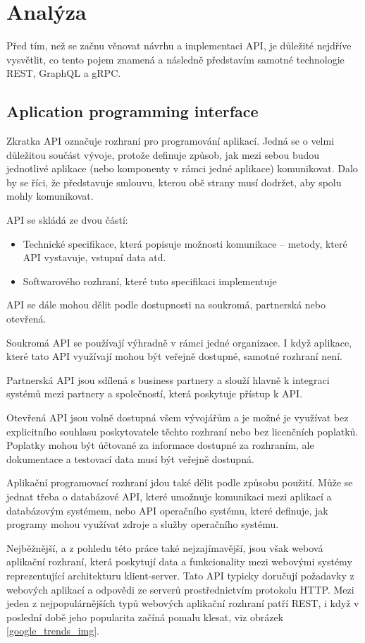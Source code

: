 \documentclass[thesis=M,czech]{FITthesis}[2019/12/23]
\begin{document}
\chapter{Analýza}
Před tím, než se začnu věnovat návrhu a implementaci API, je důležité nejdříve vysvětlit, co tento pojem znamená a následně představím samotné technologie REST, GraphQL a gRPC.

\section{Aplication programming interface}
Zkratka API označuje rozhraní pro programování aplikací. Jedná se o velmi důležitou součást vývoje, protože definuje způsob, jak mezi sebou budou jednotlivé aplikace (nebo komponenty v rámci jedné aplikace) komunikovat. Dalo by se říci, že představuje smlouvu, kterou obě strany musí dodržet, aby spolu mohly komunikovat.

API se skládá ze dvou částí: 
\begin{itemize}
    \item Technické specifikace, která popisuje možnosti komunikace -- metody, které API vystavuje, vstupní data atd.
    \item Softwarového rozhraní, které tuto specifikaci implementuje
\end{itemize}

API se dále mohou dělit podle dostupnosti na soukromá, partnerská nebo otevřená. 

Soukromá API se používají výhradně v rámci jedné organizace. I když aplikace, které tato API využívají mohou být veřejně dostupné, samotné rozhraní není.

Partnerská API jsou sdílená s business partnery a slouží hlavně k integraci systémů mezi partnery a společností, která poskytuje přístup k API.

Otevřená API jsou volně dostupná všem vývojářům a je možné je využívat bez explicitního souhlasu poskytovatele těchto rozhraní nebo bez licenčních poplatků. Poplatky mohou být účtované za informace dostupné za rozhraním, ale dokumentace a testovací data musí být veřejně dostupná.

Aplikační programovací rozhraní jdou také dělit podle způsobu použití. Může se jednat třeba o databázové API, které umožnuje komunikaci mezi aplikací a databázovým systémem, nebo API operačního systému, které definuje, jak programy mohou využívat zdroje a služby operačního systému.

Nejběžnější, a z pohledu této práce také nejzajímavější, jsou však webová aplikační rozhraní, která poskytují data a funkcionality mezi webovými systémy reprezentující architekturu klient-server. Tato API typicky doručují požadavky z webových aplikací a odpovědi ze serverů prostřednictvím protokolu HTTP. Mezi jeden z nejpopulárnějších typů webových aplikační rozhraní patří REST, i když v poslední době jeho popularita začíná pomalu klesat, viz obrázek \ref{google_trends_img}.
\end{document}
